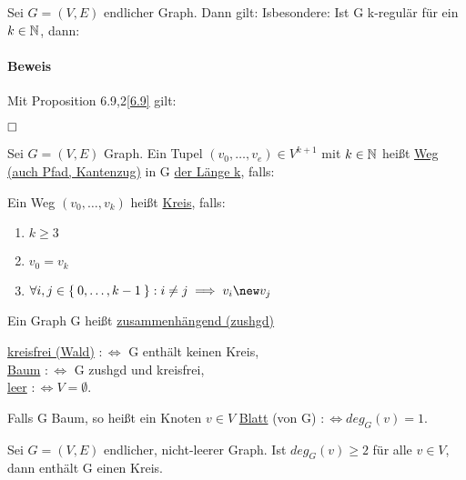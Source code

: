\documentclass{../../meta/tudscript}
\begin{document}
\setcounter{section}{13}
\setcounter{subcounter}{3}
        Sei $G = (V, E)$ endlicher Graph. Dann gilt:
        Isbesondere: Ist G k-regulär für ein $k \in \mathbb{N}$, dann:
        
        \paragraph{Beweis}
        Mit Proposition 6.9,2\ref{6.9} gilt:


        $\hfill\square$
        
        Sei $G = (V, E)$ Graph.
        Ein Tupel $(v_0, \ldots, v_e) \in V^{k + 1}$ mit $k \in \mathbb{N}$ heißt
        \underline{Weg (auch Pfad, Kantenzug)} in G \underline{der Länge k}, falls:

        Ein Weg $(v_0, \ldots, v_k)$ heißt \underline{Kreis}, falls:
        \begin{enumerate}
            \item $k \geq 3$
            \item $v_0 = v_k$
            \item $\forall i, j \in \Set{0, \ldots, k-1} : i \neq j \implies v_i \new v_j$
        \end{enumerate}
        
        Ein Graph G heißt \underline{zusammenhängend (zushgd)}
        
        \underline{kreisfrei (Wald)} $:\iff$ G enthält keinen Kreis,\\
        \underline{Baum} $:\iff$ G zushgd und kreisfrei,\\
        \underline{leer} $:\iff V = \emptyset$.

        Falls G Baum, so heißt ein Knoten $v \in V$ \underline{Blatt} (von G) $:\iff deg_G (v) = 1$.

        Sei $G = (V, E)$ endlicher, nicht-leerer Graph. Ist $deg_G (v) \geq 2$ für alle $v \in V$, dann enthält G einen Kreis.
\end{document}
